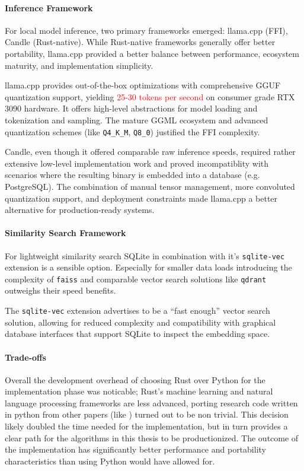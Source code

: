 \paragraph{Inference Framework}

For local model inference, two primary frameworks emerged: llama.cpp (FFI), 
Candle (Rust-native). While Rust-native frameworks generally offer better 
portability, llama.cpp provided a better balance between performance, ecosystem 
maturity, and implementation simplicity.

llama.cpp provides out-of-the-box optimizations with comprehensive GGUF 
quantization support, yielding \textcolor{red}{25-30 tokens per second} on
consumer grade RTX 3090 hardware. It offers high-level abstractions for model
loading and tokenization and sampling. The mature GGML ecosystem and advanced
quantization schemes (like \texttt{Q4\_K\_M}, \texttt{Q8\_0}) justified the FFI
complexity.

Candle, even though it offered comparable raw inference speeds, required
rather extensive low-level implementation work and proved incompatiblity with
scenarios where the resulting binary is embedded into a database (e.g. PostgreSQL).
The combination of manual tensor management, more convoluted quantization support,
and deployment constraints made llama.cpp a better alternative for
production-ready systems.

\paragraph{Similarity Search Framework}

For lightweight similarity search SQLite in combination with it's
\texttt{sqlite-vec} extension is a sensible option. Especially for smaller data
loads introducing the complexity of \texttt{faiss} and comparable vector search
solutions like \texttt{qdrant} outweighs their speed benefits.

The \texttt{sqlite-vec} extension advertises to be a ``fast enough'' vector
search solution, allowing for reduced complexity and compatibility with
graphical database interfaces that support SQLite to inspect the embedding
space.

\paragraph{Trade-offs}

Overall the development overhead of choosing Rust over Python for the
implementation phase was noticable; Rust's machine learning and natural
language processing frameworks are less advanced, porting research code written
in python from other papers (like \cite{OmniSQL}) turned out to be non trivial.
This decision likely doubled the time needed for the implementation, but in
turn provides a clear path for the algorithms in this thesis to be
productionized. The outcome of the implementation has significantly better
performance and portability characteristics than using Python would have
allowed for.

